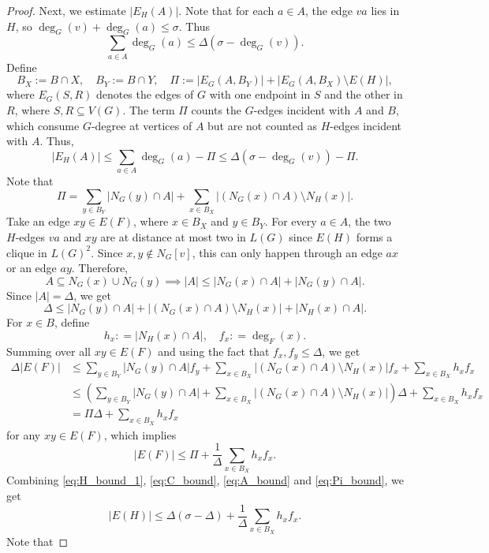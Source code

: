 \documentclass[10pt,a4paper]{amsart}
\begin{document}
\begin{proof}
Next, we estimate $|E_H(A)|$. Note that for each $a\in A$, the edge $va$ lies in $H$, so $\deg_G(v)+\deg_G(a)\le \sigma.$
Thus
\[
   \sum_{a\in A}\deg_G(a)\le \Delta(\sigma-\deg_G(v)).
\]
Define 
\[
  B_X:=B\cap X,\quad B_Y:=B\cap Y, \quad   \Pi:= |E_G(A,B_Y)| + |E_G(A,B_X)\setminus E(H)|,
\]
where $E_G(S,R)$ denotes the edges of $G$ with one endpoint in $S$ and the other in $R$, where $S, R\subseteq V(G)$. The term $\Pi$ counts the $G$-edges incident with $A$ and $B$, which consume $G$-degree at vertices of $A$ but are not counted as $H$-edges incident with $A$. Thus, 
\begin{equation}\label{eq:A_bound}
    |E_H(A)| \le \sum_{a\in A}\deg_G(a)-\Pi \le \Delta(\sigma-\deg_G(v))-\Pi.
\end{equation}
Note that 
\[
   \Pi= \sum_{y\in B_Y} |N_G(y)\cap A| + \sum_{x\in B_X} |(N_G(x)\cap A)\setminus N_H(x)|.
\]
Take an edge $xy\in E(F)$, where $x\in B_X$ and $y\in B_Y$. For every
$a\in A$, the two $H$-edges $va$ and $xy$ are at distance at most
two in $L(G)$ since $E(H)$ forms a clique in $L(G)^2$. Since $x,y\notin N_G[v]$, this can only happen through
an edge $ax$ or an edge $ay$. Therefore,
\[
   A\subseteq N_G(x)\cup N_G(y) \implies   |A|\le |N_G(x)\cap A| + |N_G(y)\cap A|.
\]
Since $|A| = \Delta$, we get 
\[ \Delta \le  |N_G(y)\cap A|  + |(N_G(x)\cap A)\setminus N_H(x)| + |N_H(x)\cap A|. \]
For $x\in B$, define 
\[ h_x : = |N_H(x)\cap A|, \quad f_x: = \deg_{F}(x).\]
Summing over all $xy\in E(F)$ and using the fact that $f_x, f_y\le \Delta$, we get
\begin{align*}
    \Delta |E(F)|
    & \le  \sum_{y\in B_Y}|N_G(y)\cap A|f_y  + \sum_{x\in B_X}|(N_G(x)\cap A)\setminus N_H(x)|f_x + \sum_{x\in B_X}h_xf_x\\
   & \le  \left(\sum_{y\in B_Y}|N_G(y)\cap A|  + \sum_{x\in B_X}|(N_G(x)\cap A)\setminus N_H(x)|\right)\Delta + \sum_{x\in B_X}h_xf_x\\
   &  = \Pi \Delta +  \sum_{x\in B_X}h_xf_x
\end{align*}
for any $xy\in E(F)$, which implies
\begin{equation}\label{eq:Pi_bound}
   |E(F)|\le \Pi+\frac{1}{\Delta}\sum_{x\in B_X}h_xf_x. 
\end{equation}
Combining \eqref{eq:H_bound_1}, \eqref{eq:C_bound}, \eqref{eq:A_bound} and \eqref{eq:Pi_bound}, we get 
\begin{equation}\label{eq:H_bound_2}
   |E(H)| \le \Delta(\sigma-\Delta) + \frac{1}{\Delta}\sum_{x\in B_X}h_xf_x. 
\end{equation}
Note that 

\end{proof}
\end{document}
